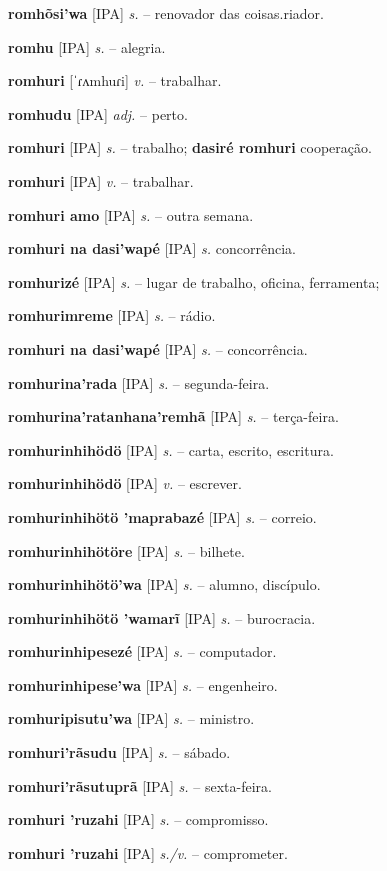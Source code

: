 \textbf{romhõsi'wa} [IPA] \textit{s.} -- renovador das coisas.riador.

\textbf{romhu} [IPA] \textit{s.} -- alegria.

\textbf{romhuri} [ˈɾʌmhuɾi] \textit{v.} -- trabalhar.

\textbf{romhudu} [IPA] \textit{adj.} -- perto.

\textbf{romhuri} [IPA] \textit{s.} -- trabalho; \textbf{dasiré romhuri} cooperação.

\textbf{romhuri} [IPA] \textit{v.} -- trabalhar.

\textbf{romhuri amo} [IPA] \textit{s.} -- outra semana.

\textbf{romhuri na dasi'wapé} [IPA] \textit{s.} concorrência.

\textbf{romhurizé} [IPA] \textit{s.} -- lugar de trabalho, oficina, ferramenta; 

\textbf{romhurimreme} [IPA] \textit{s.} -- rádio.

\textbf{romhuri na dasi'wapé} [IPA] \textit{s.} -- concorrência.

\textbf{romhurina'rada} [IPA] \textit{s.} -- segunda-feira.

\textbf{romhurina'ratanhana'remhã} [IPA] \textit{s.} -- terça-feira.

\textbf{romhurinhihödö} [IPA] \textit{s.} -- carta, escrito, escritura.

\textbf{romhurinhihödö} [IPA] \textit{v.} -- escrever.

\textbf{romhurinhihötö 'maprabazé} [IPA] \textit{s.} -- correio.

\textbf{romhurinhihötöre} [IPA] \textit{s.} -- bilhete.

\textbf{romhurinhihötö'wa} [IPA] \textit{s.} -- alumno, discípulo.

\textbf{romhurinhihötö 'wamarĩ} [IPA] \textit{s.} -- burocracia.

\textbf{romhurinhipesezé} [IPA] \textit{s.} -- computador.

\textbf{romhurinhipese'wa} [IPA] \textit{s.} -- engenheiro.

\textbf{romhuripisutu'wa} [IPA] \textit{s.} -- ministro.

\textbf{romhuri'rãsudu} [IPA] \textit{s.} -- sábado.

\textbf{romhuri'rãsutuprã} [IPA] \textit{s.} -- sexta-feira.

\textbf{romhuri 'ruzahi} [IPA] \textit{s.} -- compromisso.

\textbf{romhuri 'ruzahi} [IPA] \textit{s./v.} -- comprometer.

